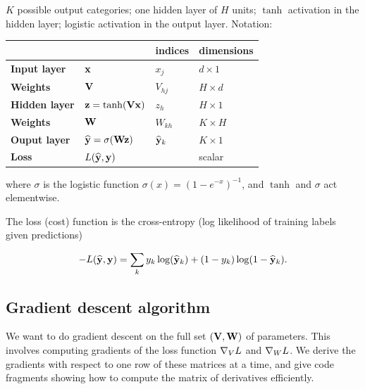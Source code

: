 \begin{mdframed}
$K$ possible output categories; one hidden layer of $H$ units; $\tanh$
activation in the hidden layer; logistic activation in the output
layer. Notation:

\begin{tabular}{l|l|l|l}
                        &                                  & indices   & dimensions \\
  \hline
  \textbf{Input layer}  & $\mathbf x$                             & $x_j$     & $d \times 1$ \\
  \textbf{Weights}      & $\mathbf V$                             & $V_{hj}$  & $H \times d$ \\
  \textbf{Hidden layer} & $\mathbf z = \tanh(\mathbf V \mathbf x)$          & $z_h$     & $H \times 1$ \\
  \textbf{Weights}      & $\mathbf W$                             & $W_{kh}$  & $K \times H$ \\
  \textbf{Ouput layer}  & $\mathbf {\mathbf{\widehat{y}}} = \sigma(\mathbf W \mathbf z)$     & $\mathbf{\widehat{y}}_k$ & $K \times 1$ \\
  \textbf{Loss}         & $L(\mathbf {\mathbf{\widehat{y}}}, \mathbf y)$          &           & scalar \\
\end{tabular}

where $\sigma$ is the logistic function $\sigma(x) = (1-e^{-x})^{-1}$, and
$\tanh$ and $\sigma$ act elementwise.

The loss (cost) function is the cross-entropy (log likelihood of training labels given
predictions)

\begin{align*}
  -L(\mathbf{\widehat{y}}, \mathbf y) = \sum_k y_k \log(\mathbf{\widehat{y}}_k) + (1 - y_k) \log( 1 - \mathbf{\widehat{y}}_k).
\end{align*}

\subsection{Gradient descent algorithm}

We want to do gradient descent on the full set $(\mathbf V, \mathbf W)$ of
parameters. This involves computing gradients of the loss function $\nabla_V L$
and $\nabla_W L$. We derive the gradients with respect to one row of these
matrices at a time, and give code fragments showing how to compute the matrix
of derivatives efficiently.



\end{mdframed}
